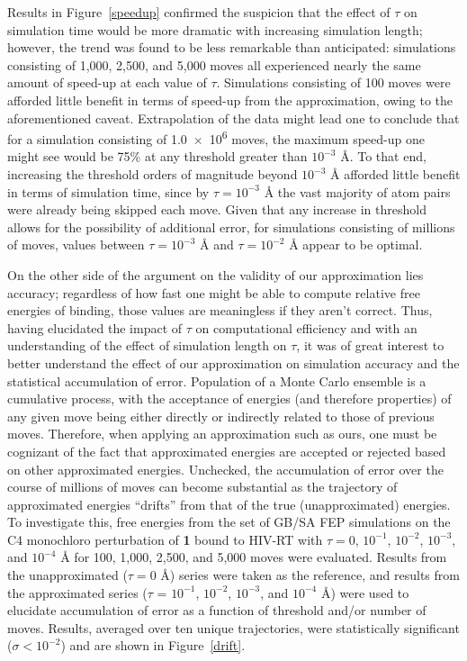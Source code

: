 \documentclass[12pt]{report}
\def\figlab{Figure}\def\figslab{\figlab s}
\newcommand*\fig[1]{\figlab~\ref{#1}}
\begin{document}
Results in \fig{speedup} confirmed the suspicion that the effect of $\tau$ on simulation time would be more dramatic with increasing simulation length; however, the trend was found to be less remarkable than anticipated: simulations consisting of 1,000, 2,500, and 5,000 moves all experienced nearly the same amount of speed-up at each value of $\tau$. Simulations consisting of 100 moves were afforded little benefit in terms of speed-up from the approximation, owing to the aforementioned caveat. Extrapolation of the data might lead one to conclude that for a simulation consisting of \num{1.0e6} moves, the maximum speed-up one might see would be 75\% at any threshold greater than $10^{-3}$ \AA. To that end, increasing the threshold orders of magnitude beyond $10^{-3}$ \AA{} afforded little benefit in terms of simulation time, since by $\tau = 10^{-3}$ \AA{} the vast majority of atom pairs were already being skipped each move. Given that any increase in threshold allows for the possibility of additional error, for simulations consisting of millions of moves, values between $\tau = 10^{-3}$ \AA{} and $\tau = 10^{-2}$ \AA{} appear to be optimal.

On the other side of the argument on the validity of our approximation lies accuracy; regardless of how fast one might be able to compute relative free energies of binding, those values are meaningless if they aren't correct. Thus, having elucidated the impact of $\tau$ on computational efficiency and with an understanding of the effect of simulation length on $\tau$, it was of great interest to better understand the effect of our approximation on simulation accuracy and the statistical accumulation of error. Population of a Monte Carlo ensemble is a cumulative process, with the acceptance of energies (and therefore properties) of any given move being either directly or indirectly related to those of previous moves. Therefore, when applying an approximation such as ours, one must be cognizant of the fact that approximated energies are accepted or rejected based on other approximated energies. Unchecked, the accumulation of error over the course of millions of moves can become substantial as the trajectory of approximated energies ``drifts'' from that of the true (unapproximated) energies. To investigate this, free energies from the set of GB/SA FEP simulations on the C4 monochloro perturbation of \textbf{1} bound to HIV-RT with $\tau = 0$, $10^{-1}$, $10^{-2}$, $10^{-3}$, and $10^{-4}$ \AA{} for 100, 1,000, 2,500, and 5,000 moves were evaluated. Results from the unapproximated ($\tau = 0$ \AA) series were taken as the reference, and results from the approximated series ($\tau$ = $10^{-1}$, $10^{-2}$, $10^{-3}$, and $10^{-4}$ \AA) were used to elucidate accumulation of error as a function of threshold and/or number of moves. Results, averaged over ten unique trajectories, were statistically significant ($\sigma < 10^{-2}$) and are shown in \fig{drift}.
\end{document}
